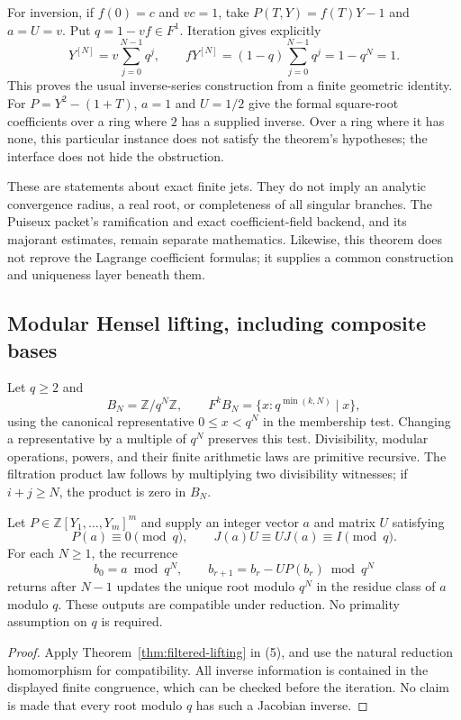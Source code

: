 For inversion, if $f(0)=c$ and $vc=1$, take $P(T,Y)=f(T)Y-1$ and
$a=U=v$.  Put $q=1-vf\in F^1$.  Iteration gives explicitly
\[
 Y^{[N]}=v\sum_{j=0}^{N-1}q^j,
 \qquad fY^{[N]}=(1-q)\sum_{j=0}^{N-1}q^j=1-q^N=1.
\]
This proves the usual inverse-series construction from a finite geometric
identity.  For $P=Y^2-(1+T)$, $a=1$ and $U=1/2$ give the formal square-root
coefficients over a ring where $2$ has a supplied inverse.  Over a ring
where it has none, this particular instance does not satisfy the theorem's
hypotheses; the interface does not hide the obstruction.

These are statements about exact finite jets.  They do not imply an
analytic convergence radius, a real root, or completeness of all singular
branches.  The Puiseux packet's ramification and exact coefficient-field
backend, and its majorant estimates, remain separate mathematics.
Likewise, this theorem does not reprove the Lagrange coefficient formulas;
it supplies a common construction and uniqueness layer beneath them.

\subsection{Modular Hensel lifting, including composite bases}

Let $q\ge2$ and
\[
 B_N=\mathbb Z/q^N\mathbb Z,\qquad
 F^kB_N=\{x:q^{\min(k,N)}\mid x\},            \tag{5}
\]
using the canonical representative $0\le x<q^N$ in the membership test.
Changing a representative by a multiple of $q^N$ preserves this test.
Divisibility, modular operations, powers, and their finite arithmetic
laws are primitive recursive.  The filtration product law follows by
multiplying two divisibility witnesses; if $i+j\ge N$, the product
is zero in $B_N$.

\begin{corollary}
\label{cor:modular-hensel}
Let $P\in\mathbb Z[Y_1,\ldots,Y_m]^m$ and supply an integer vector $a$
and matrix $U$ satisfying
\[
 P(a)\equiv0\pmod q,\qquad
 J(a)U\equiv UJ(a)\equiv I\pmod q.
\]
For each $N\ge1$, the recurrence
\[
 b_0=a\bmod q^N,\qquad
 b_{r+1}=b_r-UP(b_r)\bmod q^N
\]
returns after $N-1$ updates the unique root modulo $q^N$ in the residue
class of $a$ modulo $q$.  These outputs are compatible under reduction.
No primality assumption on $q$ is required.
\end{corollary}

\begin{proof}
Apply Theorem~\ref{thm:filtered-lifting} in (5), and use the natural
reduction homomorphism for compatibility.  All inverse information is
contained in the displayed finite congruence, which can be checked before
the iteration.  No claim is made that every root modulo $q$ has such a
Jacobian inverse.
\end{proof}

